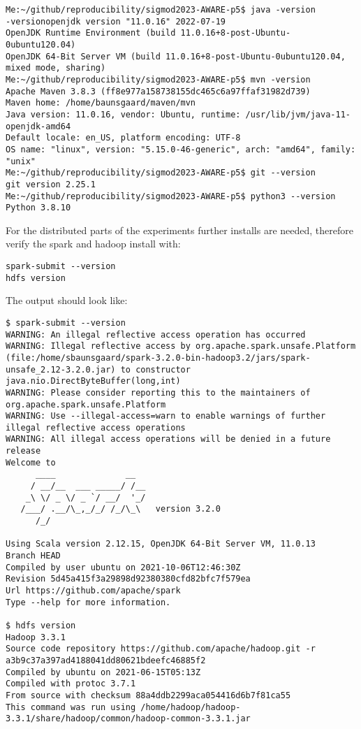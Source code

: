 \documentclass{readme}
\begin{document}
\begin{lstlisting}
Me:~/github/reproducibility/sigmod2023-AWARE-p5$ java -version
-versionopenjdk version "11.0.16" 2022-07-19
OpenJDK Runtime Environment (build 11.0.16+8-post-Ubuntu-0ubuntu120.04)
OpenJDK 64-Bit Server VM (build 11.0.16+8-post-Ubuntu-0ubuntu120.04, mixed mode, sharing)
Me:~/github/reproducibility/sigmod2023-AWARE-p5$ mvn -version
Apache Maven 3.8.3 (ff8e977a158738155dc465c6a97ffaf31982d739)
Maven home: /home/baunsgaard/maven/mvn
Java version: 11.0.16, vendor: Ubuntu, runtime: /usr/lib/jvm/java-11-openjdk-amd64
Default locale: en_US, platform encoding: UTF-8
OS name: "linux", version: "5.15.0-46-generic", arch: "amd64", family: "unix"
Me:~/github/reproducibility/sigmod2023-AWARE-p5$ git --version
git version 2.25.1
Me:~/github/reproducibility/sigmod2023-AWARE-p5$ python3 --version
Python 3.8.10
\end{lstlisting}

\noindent
For the distributed parts of the experiments further installs are needed,
therefore verify the spark and hadoop install with:

\begin{lstlisting}
spark-submit --version
hdfs version
\end{lstlisting}

\noindent
The output should look like:

\begin{lstlisting}
$ spark-submit --version
WARNING: An illegal reflective access operation has occurred
WARNING: Illegal reflective access by org.apache.spark.unsafe.Platform (file:/home/sbaunsgaard/spark-3.2.0-bin-hadoop3.2/jars/spark-unsafe_2.12-3.2.0.jar) to constructor java.nio.DirectByteBuffer(long,int)
WARNING: Please consider reporting this to the maintainers of org.apache.spark.unsafe.Platform
WARNING: Use --illegal-access=warn to enable warnings of further illegal reflective access operations
WARNING: All illegal access operations will be denied in a future release
Welcome to
      ____              __
     / __/__  ___ _____/ /__
    _\ \/ _ \/ _ `/ __/  '_/
   /___/ .__/\_,_/_/ /_/\_\   version 3.2.0
      /_/
                        
Using Scala version 2.12.15, OpenJDK 64-Bit Server VM, 11.0.13
Branch HEAD
Compiled by user ubuntu on 2021-10-06T12:46:30Z
Revision 5d45a415f3a29898d92380380cfd82bfc7f579ea
Url https://github.com/apache/spark
Type --help for more information.

$ hdfs version
Hadoop 3.3.1
Source code repository https://github.com/apache/hadoop.git -r a3b9c37a397ad4188041dd80621bdeefc46885f2
Compiled by ubuntu on 2021-06-15T05:13Z
Compiled with protoc 3.7.1
From source with checksum 88a4ddb2299aca054416d6b7f81ca55
This command was run using /home/hadoop/hadoop-3.3.1/share/hadoop/common/hadoop-common-3.3.1.jar
\end{lstlisting}
\end{document}
